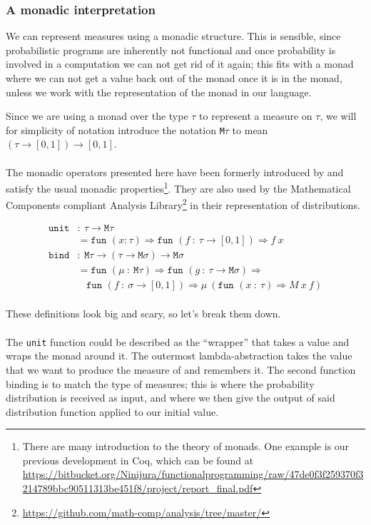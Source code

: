 \documentclass[11pt, leqno, titlepage]{article}
\theoremstyle{definition}
\begin{document}
\subsubsection{A monadic interpretation}
\label{sec:monad-interp}
We can represent measures using a monadic structure. This is sensible, since
probabilistic programs are inherently not functional and once probability is involved
in a computation we can not get rid of it again; this fits with a monad where we can
not get a value back out of the monad once it is in the monad, unless we work with
the representation of the monad in our language.

Since we are using a monad over the type $\tau$ to represent a measure on $\tau$, we
will for simplicity of notation introduce the notation \texttt{M}$\tau$ to mean 
$(\tau\to[0,1])\to[0,1]$.\\ 
\\
The monadic operators presented here have been formerly introduced by \cite{rml-paper}
and satisfy the usual monadic properties\footnote{There are many introduction to the
theory of monads. One example is our previous development in Coq, which can be found
at
\url{https://bitbucket.org/Ninijura/functionalprogramming/raw/47de0f3f259370f3214789bbc90511313be451f8/project/report_final.pdf}}. They
are also used by the Mathematical Components compliant Analysis Library\footnote
{\url{https://github.com/math-comp/analysis/tree/master/}} in their representation of
distributions.

\begin{align*}
  \texttt{unit} & :~ \tau\to\texttt{M}\tau\\
                & = \texttt{fun }(x:\tau)\Rightarrow
                  \texttt{fun }(f~:~\tau\to[0,1])\Rightarrow f~x\\
  \texttt{bind} & :~\texttt{M}\tau\to(\tau\to\texttt{M}\sigma)\to\texttt{M}\sigma\\
                & = \texttt{fun }(\mu~:~\texttt{M}\tau)\Rightarrow \texttt{fun }
                  (g~:~\tau\to\texttt{M}\sigma) \Rightarrow\\
                & ~~~~\texttt{fun }(f~:~\sigma\to[0,1])\Rightarrow \mu~ (\texttt{fun
                  }(x~:~\tau)\Rightarrow M~x~f)
\end{align*}
\\
These definitions look big and scary, so let's break them down.
\\ \\
The \texttt{unit} function could be described as the ``wrapper'' that takes a value
and wraps the monad around it. The outermost lambda-abstraction takes the value that
we want to produce the measure of and remembers it. The second function binding is to
match the type of measures; this is where the probability distribution is received as
input, and where we then give the output of said distribution function applied to our
initial value.
\end{document}
